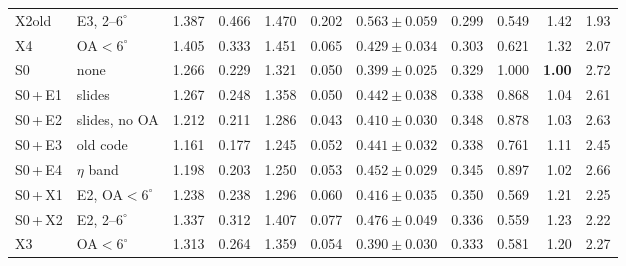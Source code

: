 \documentclass[11pt,a4paper]{article}
\newcommand{\cs}[1]{\textsf{#1}}%
\begin{document}
\begin{table}[tbp]
\begin{tabular}{@{}l l r r r r r r r r r@{}}
\cs{X2old} & \cs{E3}, 2--$6^\circ$ & 1.387 & 0.466 & 1.470 & 0.202 & $0.563\pm0.059$ & 0.299 & 0.549 & 1.42 & 1.93 \\
\cs{X4} & OA$<6^\circ$ & 1.405 & 0.333 & 1.451 & 0.065 & $0.429\pm0.034$ & 0.303 & 0.621 & 1.32 & 2.07 \\
\midrule
S0 & none & 1.266 & 0.229 & 1.321 & 0.050 & $0.399\pm0.025$ & 0.329 & 1.000 & \textbf{1.00} & 2.72 \\
S0\,+\,\cs{E1} & slides & 1.267 & 0.248 & 1.358 & 0.050 & $0.442\pm0.038$ & 0.338 & 0.868 & 1.04 & 2.61 \\
S0\,+\,\cs{E2} & slides, no OA & 1.212 & 0.211 & 1.286 & 0.043 & $0.410\pm0.030$ & 0.348 & 0.878 & 1.03 & 2.63 \\
S0\,+\,\cs{E3} & old code & 1.161 & 0.177 & 1.245 & 0.052 & $0.441\pm0.032$ & 0.338 & 0.761 & 1.11 & 2.45 \\
S0\,+\,\cs{E4} & $\eta$ band & 1.198 & 0.203 & 1.250 & 0.053 & $0.452\pm0.029$ & 0.345 & 0.897 & 1.02 & 2.66 \\
S0\,+\,\cs{X1} & \cs{E2}, OA$<6^\circ$ & 1.238 & 0.238 & 1.296 & 0.060 & $0.416\pm0.035$ & 0.350 & 0.569 & 1.21 & 2.25 \\
S0\,+\,\cs{X2} & \cs{E2}, 2--$6^\circ$ & 1.337 & 0.312 & 1.407 & 0.077 & $0.476\pm0.049$ & 0.336 & 0.559 & 1.23 & 2.22 \\
\cs{X3} & OA$<6^\circ$ & 1.313 & 0.264 & 1.359 & 0.054 & $0.390\pm0.030$ & 0.333 & 0.581 & 1.20 & 2.27 \\
\bottomrule
\end{tabular}
\end{table}
\end{document}
